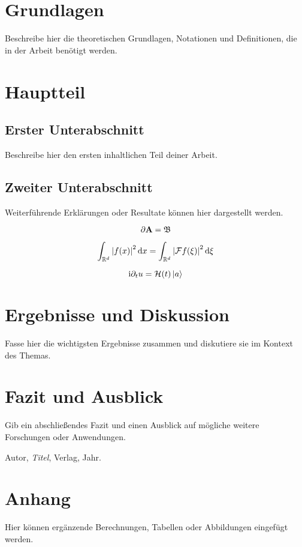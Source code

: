 \documentclass[12pt, reqno, titlepage]{amsart}
\begin{document}
\section{Grundlagen}
Beschreibe hier die theoretischen Grundlagen, Notationen und Definitionen, die in der Arbeit benötigt werden.

\section{Hauptteil}
\subsection{Erster Unterabschnitt}
Beschreibe hier den ersten inhaltlichen Teil deiner Arbeit.

\subsection{Zweiter Unterabschnitt}
Weiterführende Erklärungen oder Resultate können hier dargestellt werden.

\begin{equation*}
    \partial \mathbf{A} = \mathfrak{B}
\end{equation*}

\medskip

\begin{equation}
    \int_{\mathbb{R}^d} {\left\vert f(x)\right\vert}^2 \, \mathrm{d} x = \int_{\mathbb{R}^d} {\left\vert\mathcal{F} f(\xi)\right\vert}^2 \, \mathrm{d} \xi
\end{equation}

\medskip

\begin{equation}
    \mathrm{i} \partial_t u = \mathcal{H}(t) \Ket{a}
\end{equation}

\section{Ergebnisse und Diskussion}
Fasse hier die wichtigsten Ergebnisse zusammen und diskutiere sie im Kontext des Themas.

\section{Fazit und Ausblick}
Gib ein abschließendes Fazit und einen Ausblick auf mögliche weitere Forschungen oder Anwendungen.

\begin{thebibliography}{99}
     Autor, \emph{Titel}, Verlag, Jahr.
\end{thebibliography}

\appendix
\section{Anhang}
Hier können ergänzende Berechnungen, Tabellen oder Abbildungen eingefügt werden.
\end{document}
